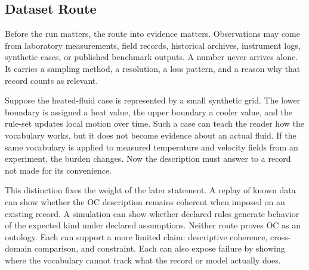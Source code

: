 \documentclass[11pt,a4paper,openany]{book}
\begin{document}
\subsection{Dataset Route}
Before the run matters, the route into evidence matters. Observations may come from laboratory measurements, field records, historical archives, instrument logs, synthetic cases, or published benchmark outputs. A number never arrives alone. It carries a sampling method, a resolution, a loss pattern, and a reason why that record counts as relevant. \cite{landau_stat_physics,prigogine_dissipative}\par
Suppose the heated-fluid case is represented by a small synthetic grid. The lower boundary is assigned a heat value, the upper boundary a cooler value, and the rule-set updates local motion over time. Such a case can teach the reader how the vocabulary works, but it does not become evidence about an actual fluid. If the same vocabulary is applied to measured temperature and velocity fields from an experiment, the burden changes. Now the description must answer to a record not made for its convenience.\par
This distinction fixes the weight of the later statement. A replay of known data can show whether the OC description remains coherent when imposed on an existing record. A simulation can show whether declared rules generate behavior of the expected kind under declared assumptions. Neither route proves OC as an ontology. Each can support a more limited claim: descriptive coherence, cross-domain comparison, and constraint. Each can also expose failure by showing where the vocabulary cannot track what the record or model actually does.\par
\end{document}
